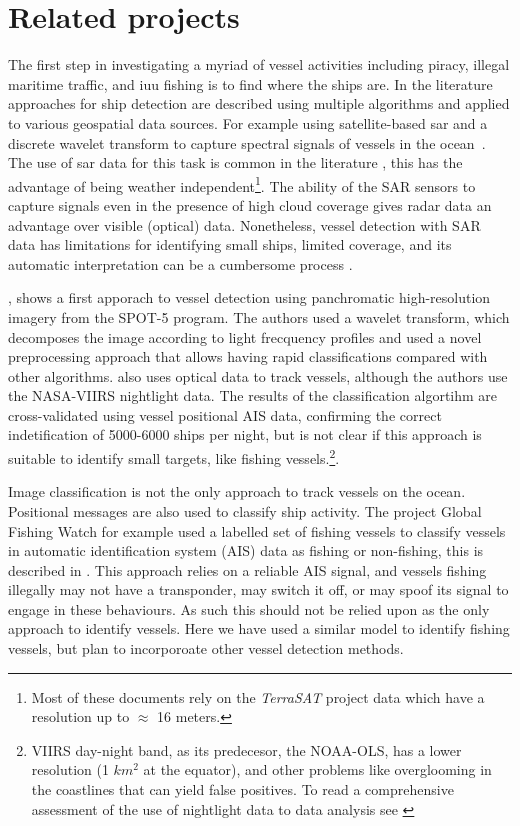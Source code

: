 \section{Related projects}
The first step in investigating a myriad of vessel activities including piracy, illegal maritime traffic, and \gls{iuu} fishing is to find where the ships are. In the literature approaches for ship detection are described using multiple algorithms and applied to various geospatial data sources. For example using satellite-based \gls{sar} and a discrete wavelet transform to capture spectral signals of vessels in the ocean~\cite{Tello2005}. The use of \gls{sar} data for this task is common in the literature \cite{Margarit2009, Brusch2011, Corbane2008, Paes2010}, this has the advantage of being weather independent\footnote{Most of these documents rely on the \textit{TerraSAT} project data which have a resolution up to $\approx$ 16 meters.}. The ability of the SAR sensors to capture signals even in the presence of high cloud coverage gives radar data an advantage over visible (optical) data. Nonetheless, vessel detection with SAR data has limitations for identifying small ships, limited coverage, and its automatic interpretation can be a cumbersome process \cite{Zhang2006}.  

\cite{Corbane2010}, shows a first apporach to vessel detection using panchromatic high-resolution imagery from the SPOT-5 program. The authors used a wavelet transform, which decomposes the image according to light frecquency profiles and used a novel preprocessing approach that allows having rapid classifications compared with other algorithms. \cite{Lebona2016} also uses optical data to track vessels, although the authors use the NASA-VIIRS nightlight data. The results of the classification algortihm are cross-validated using vessel positional AIS data, confirming the correct indetification of 5000-6000 ships per night, but is not clear if this approach is suitable to identify small targets, like fishing vessels.\footnote{VIIRS day-night band, as its predecesor, the NOAA-OLS, has a lower resolution (1 $km^{2}$ at the equator), and other problems like overglooming in the coastlines that can yield false positives. To read a comprehensive assessment of the use of nightlight data to data analysis see \cite{Min2015}}.

Image classification is not the only approach to track vessels on the ocean. Positional messages are also used to classify ship activity. The project Global Fishing Watch for example used a labelled set of fishing vessels to classify vessels in automatic identification system (AIS) data as fishing or non-fishing, this is described in \cite{de2016correction}. This approach relies on a reliable AIS signal, and vessels fishing illegally may not have a transponder, may switch it off, or may spoof its signal to engage in these behaviours. As such this should not be relied upon as the only approach to identify vessels. Here we have used a similar model to identify fishing vessels, but plan to incorporoate other vessel detection methods.
